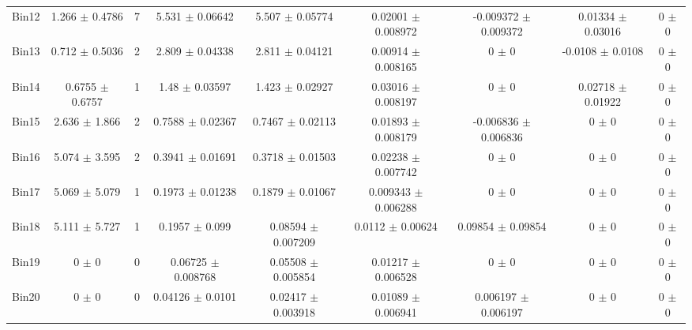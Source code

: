 \begin{tabular}{@{\extracolsep{4pt}}lcccccccc@{}}
     Bin12 & 1.266 $\pm$ 0.4786 & 7 & 5.531 $\pm$ 0.06642 & 5.507 $\pm$ 0.05774 & 0.02001 $\pm$ 0.008972 & -0.009372 $\pm$ 0.009372 & 0.01334 $\pm$ 0.03016 & 0 $\pm$ 0 \\ 
     Bin13 & 0.712 $\pm$ 0.5036 & 2 & 2.809 $\pm$ 0.04338 & 2.811 $\pm$ 0.04121 & 0.00914 $\pm$ 0.008165 & 0 $\pm$ 0 & -0.0108 $\pm$ 0.0108 & 0 $\pm$ 0 \\ 
     Bin14 & 0.6755 $\pm$ 0.6757 & 1 & 1.48 $\pm$ 0.03597 & 1.423 $\pm$ 0.02927 & 0.03016 $\pm$ 0.008197 & 0 $\pm$ 0 & 0.02718 $\pm$ 0.01922 & 0 $\pm$ 0 \\ 
     Bin15 & 2.636 $\pm$ 1.866 & 2 & 0.7588 $\pm$ 0.02367 & 0.7467 $\pm$ 0.02113 & 0.01893 $\pm$ 0.008179 & -0.006836 $\pm$ 0.006836 & 0 $\pm$ 0 & 0 $\pm$ 0 \\ 
     Bin16 & 5.074 $\pm$ 3.595 & 2 & 0.3941 $\pm$ 0.01691 & 0.3718 $\pm$ 0.01503 & 0.02238 $\pm$ 0.007742 & 0 $\pm$ 0 & 0 $\pm$ 0 & 0 $\pm$ 0 \\ 
     Bin17 & 5.069 $\pm$ 5.079 & 1 & 0.1973 $\pm$ 0.01238 & 0.1879 $\pm$ 0.01067 & 0.009343 $\pm$ 0.006288 & 0 $\pm$ 0 & 0 $\pm$ 0 & 0 $\pm$ 0 \\ 
     Bin18 & 5.111 $\pm$ 5.727 & 1 & 0.1957 $\pm$ 0.099 & 0.08594 $\pm$ 0.007209 & 0.0112 $\pm$ 0.00624 & 0.09854 $\pm$ 0.09854 & 0 $\pm$ 0 & 0 $\pm$ 0 \\ 
     Bin19 & 0 $\pm$ 0 & 0 & 0.06725 $\pm$ 0.008768 & 0.05508 $\pm$ 0.005854 & 0.01217 $\pm$ 0.006528 & 0 $\pm$ 0 & 0 $\pm$ 0 & 0 $\pm$ 0 \\ 
     Bin20 & 0 $\pm$ 0 & 0 & 0.04126 $\pm$ 0.0101 & 0.02417 $\pm$ 0.003918 & 0.01089 $\pm$ 0.006941 & 0.006197 $\pm$ 0.006197 & 0 $\pm$ 0 & 0 $\pm$ 0 \\ 
\hline\hline
  \end{tabular}
